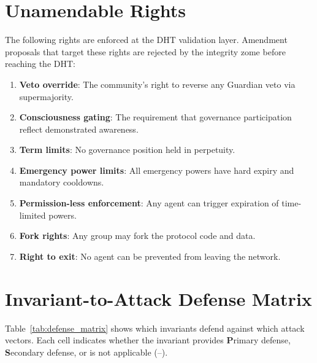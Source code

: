 \documentclass[11pt,a4paper]{article}
\begin{document}
\section{Unamendable Rights}
\label{app:rights}

The following rights are enforced at the DHT validation layer. Amendment proposals that target these rights are rejected by the integrity zome before reaching the DHT:

\begin{enumerate}
    \item \textbf{Veto override}: The community's right to reverse any Guardian veto via supermajority.
    \item \textbf{Consciousness gating}: The requirement that governance participation reflect demonstrated awareness.
    \item \textbf{Term limits}: No governance position held in perpetuity.
    \item \textbf{Emergency power limits}: All emergency powers have hard expiry and mandatory cooldowns.
    \item \textbf{Permission-less enforcement}: Any agent can trigger expiration of time-limited powers.
    \item \textbf{Fork rights}: Any group may fork the protocol code and data.
    \item \textbf{Right to exit}: No agent can be prevented from leaving the network.
\end{enumerate}

\section{Invariant-to-Attack Defense Matrix}
\label{app:matrix}

Table~\ref{tab:defense_matrix} shows which invariants defend against which attack vectors. Each cell indicates whether the invariant provides \textbf{P}rimary defense, \textbf{S}econdary defense, or is not applicable (--).
\end{document}
